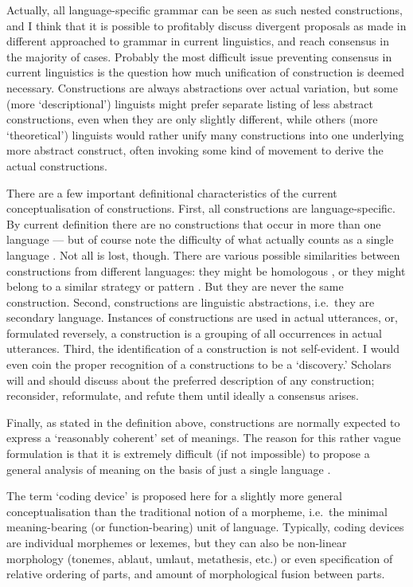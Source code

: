 Actually, all language-specific grammar can be seen as such nested constructions, and I think that it is possible to profitably discuss divergent proposals as made in different approached to grammar in current linguistics, and reach consensus in the majority of cases. Probably the most difficult issue preventing consensus in current linguistics is the question how much unification of construction is deemed necessary. Constructions are always abstractions over actual variation, but some (more `descriptional') linguists might prefer separate listing of less abstract constructions, even when they are only slightly different, while others (more `theoretical') linguists would rather unify many constructions into one underlying more abstract construct, often invoking some kind of movement to derive the actual constructions.

There are a few important definitional characteristics of the current conceptualisation of constructions. First, all constructions are language-specific. By current definition there are no constructions that occur in more than one language --- but of course note the difficulty of what actually counts as a single language . Not all is lost, though. There are various possible similarities between constructions from different languages: they might be homologous , or they might belong to a similar strategy  or pattern . But they are never the same construction. Second, constructions are linguistic abstractions, i.e.~they are secondary language. Instances of constructions are used in actual utterances, or, formulated reversely, a construction is a grouping of all occurrences in actual utterances. Third, the identification of a construction is not self-evident. I would even coin the proper recognition of a constructions to be a `discovery.' Scholars will and should discuss about the preferred description of any construction; reconsider, reformulate, and refute them until ideally a consensus arises.

Finally, as stated in the definition above, constructions are normally expected to express a `reasonably coherent' set of meanings. The reason for this rather vague formulation is that it is extremely difficult (if not impossible) to propose a general analysis of meaning on the basis of just a single language .

%
The term `coding device' is proposed here for a slightly more general conceptualisation than the traditional notion of a morpheme, i.e.~the minimal meaning-bearing (or function-bearing) unit of language. Typically, coding devices are individual morphemes or lexemes, but they can also be non-linear morphology (tonemes, ablaut, umlaut, metathesis, etc.) or even specification of relative ordering of parts, and amount of morphological fusion between parts.

